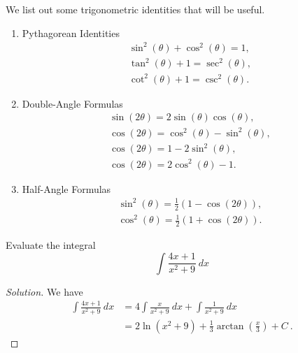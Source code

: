 \documentclass[compacto,10pt,comentarios]{aleph-notas}
\begin{document}
\begin{itemize}
    We list out some trigonometric identities that will be useful.
    \begin{enumerate}
        \item Pythagorean Identities
        \begin{align*}
            \sin^{2}(\theta) + \cos^{2}(\theta) = 1, \\
            \tan^{2}(\theta) + 1 = \sec^{2}(\theta), \\
            \cot^{2}(\theta) + 1 = \csc^{2}(\theta).
        \end{align*}
        \item Double-Angle Formulas
        \begin{align*}
            \sin(2\theta) = 2 \sin(\theta) \cos(\theta), \\
            \cos(2\theta) = \cos^{2}(\theta) - \sin^{2}(\theta), \\
            \cos(2\theta) = 1 - 2\sin^{2}(\theta), \\
            \cos(2\theta) = 2 \cos^{2}(\theta) - 1.
        \end{align*}
        \item Half-Angle Formulas
        \begin{align*}
            \sin^{2}(\theta) = \frac{1}{2} \left( 1 - \cos(2\theta) \right), \\
            \cos^{2}(\theta) = \frac{1}{2} \left( 1 + \cos(2\theta) \right).
        \end{align*}
    \end{enumerate}
\end{itemize}

\begin{ejer}
    Evaluate the integral
    $$
        \int \frac{4x + 1}{x^{2} + 9} ~ dx
    $$
\end{ejer}
\begin{proof}[Solution]
    We have
    \begin{align*}
        \int \frac{4x + 1}{x^{2} + 9} ~ dx 
        & = 4\int \frac{x}{x^{2} + 9} ~ dx + \int \frac{1}{x^{2} + 9} ~ dx \\
        & = 2 \ln(x^{2} + 9) + \frac{1}{3} \arctan\left(\frac{x}{3}\right) + C ~ .
    \end{align*}
\end{proof}
\end{document}
